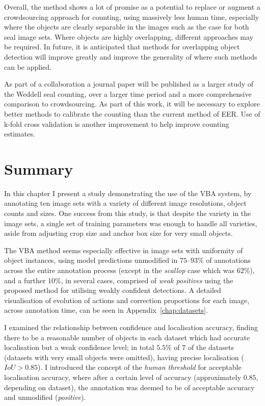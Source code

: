 Overall, the method shows a lot of promise as a potential to replace or augment a crowdsourcing approach for counting, using massively less human time, especially where the objects are clearly separable in the images such as the case for both seal image sets. Where objects are highly overlapping, different approaches may be required. In future, it is anticipated that methods for overlapping object detection will improve greatly and improve the generality of where such methods can be applied.

As part of a collaboration a journal paper will be published as a larger study of the Weddell seal counting, over a larger time period and a more comprehensive comparison to crowdsourcing. As part of this work, it will be necessary to explore better methods to calibrate the counting than the current method of \gls{EER}. Use of k-fold cross validation is another improvement to help improve counting estimates. 


\section{Summary}
\label{sec:summary}

In this chapter I present a study demonstrating the use of the \gls{VBA} system, by annotating ten image sets with a variety of different image resolutions, object counts and sizes. One success from this study, is that despite the variety in the image sets, a single set of training parameters was enough to handle all varieties, aside from adjusting crop size and anchor box size for very small objects.

The \gls{VBA} method seems especially effective in image sets with uniformity of object instances, using model predictions unmodified in $75$--$93\%$ of annotations across the entire annotation process (except in the \emph{scallop} case which was $62\%$), and a further $10\%$, in several cases, comprised of \emph{weak positives} using the proposed method for utilising weakly confident detections. A detailed visualisation of evolution of actions and correction proportions for each image, across annotation time, can be seen in Appendix~\ref{chap:datasets}.

I examined the relationship between confidence and localisation accuracy, finding there to be a reasonable number of objects in each dataset which had accurate localisation but a weak confidence level; in total $5.5\%$ of $7$ of the datasets (datasets with very small objects were omitted), having precise localisation ($ IoU > 0.85$). I introduced the concept of the \emph{human threshold} for acceptable localisation accuracy, where after a certain level of accuracy (approximately $0.85$, depending on dataset), the annotation was deemed to be of acceptable accuracy and unmodified (\emph{positive}). 

